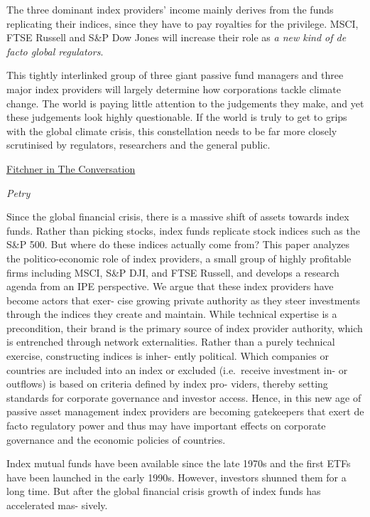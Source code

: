 \documentclass[
]{book}
\begin{document}
The three dominant index providers' income mainly derives from the funds replicating their indices, since they have to pay royalties for the privilege.
MSCI, FTSE Russell and S\&P Dow Jones will increase their role as \emph{a new kind of de facto
global regulators}.

This tightly interlinked group of three giant passive fund managers and three major index providers will largely determine how corporations tackle climate change. The world is paying little attention to the judgements they make, and yet these judgements look highly questionable. If the world is truly to get to grips with the global climate crisis, this constellation needs to be far more closely scrutinised by regulators, researchers and the general public.

\href{https://theconversation.com/three-financial-firms-could-change-the-direction-of-the-climate-crisis-and-few-people-have-any-idea-131869}{Fitchner in The Conversation}

\emph{Petry}

Since the global financial crisis, there is a massive shift of assets towards index
funds. Rather than picking stocks, index funds replicate stock indices such as the
S\&P 500. But where do these indices actually come from? This paper analyzes the
politico-economic role of index providers, a small group of highly profitable firms
including MSCI, S\&P DJI, and FTSE Russell, and develops a research agenda from an
IPE perspective. We argue that these index providers have become actors that exer-
cise growing private authority as they steer investments through the indices they
create and maintain. While technical expertise is a precondition, their brand is the
primary source of index provider authority, which is entrenched through network
externalities. Rather than a purely technical exercise, constructing indices is inher-
ently political. Which companies or countries are included into an index or excluded
(i.e.~receive investment in- or outflows) is based on criteria defined by index pro-
viders, thereby setting standards for corporate governance and investor access.
Hence, in this new age of passive asset management index providers are becoming
gatekeepers that exert de facto regulatory power and thus may have important
effects on corporate governance and the economic policies of countries.

Index mutual funds have been available since the late 1970s and the first ETFs
have been launched in the early 1990s. However, investors shunned them for a long
time. But after the global financial crisis growth of index funds has accelerated mas-
sively.
\end{document}

